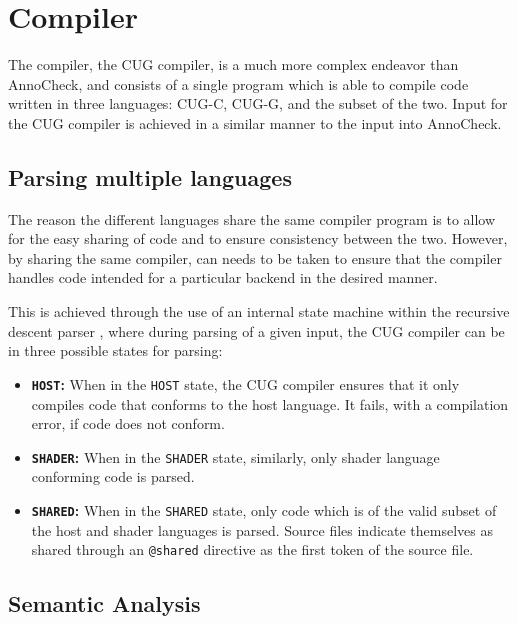 \documentclass[a4paper,12pt,twoside,openright]{report}
\begin{document}

\section{Compiler}

The compiler, the CUG compiler, is a much more complex endeavor than AnnoCheck,
and consists of a single program which is able to compile code written in three
languages: CUG-C, CUG-G, and the subset of the two. Input for the CUG compiler
is achieved in a similar manner to the input into AnnoCheck.

\subsection{Parsing multiple languages}

The reason the different languages share the same compiler program is to allow
for the easy sharing of code and to ensure consistency between the two.
However, by sharing the same compiler, can needs to be taken to ensure that the
compiler handles code intended for a particular backend in the desired manner.

This is achieved through the use of an internal state machine within the
recursive descent parser , where during parsing of a given input, the CUG compiler
can be in three possible states for parsing:

\begin{itemize}

    \item \textbf{\texttt{HOST}:} When in the \texttt{HOST} state, the CUG compiler
    ensures that it only compiles code that conforms to the host language. It
    fails, with a compilation error, if code does not conform.

    \item \textbf{\texttt{SHADER}:} When in the \texttt{SHADER} state,
    similarly, only shader language conforming code is parsed.

    \item \textbf{\texttt{SHARED}:} When in the \texttt{SHARED} state, only
    code which is of the valid subset of the host and shader languages is
    parsed. Source files indicate themselves as shared through an
    \texttt{@shared} directive as the first token of the source file.

\end{itemize}

\subsection{Semantic Analysis}
\end{document}
